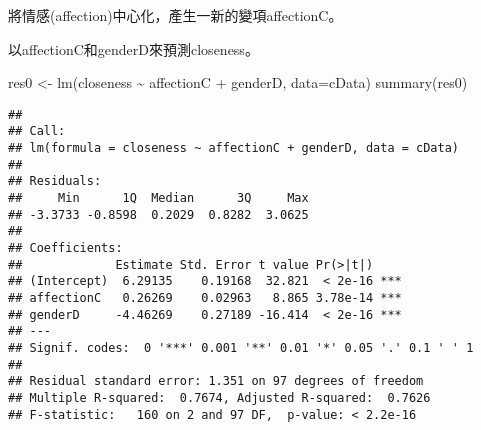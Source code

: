 \documentclass[
]{book}
\newenvironment{Shaded}{\begin{snugshade}}{\end{snugshade}}
\newcommand{\AttributeTok}[1]{\textcolor[rgb]{0.77,0.63,0.00}{#1}}
\newcommand{\ConstantTok}[1]{\textcolor[rgb]{0.00,0.00,0.00}{#1}}
\newcommand{\DecValTok}[1]{\textcolor[rgb]{0.00,0.00,0.81}{#1}}
\newcommand{\FunctionTok}[1]{\textcolor[rgb]{0.00,0.00,0.00}{#1}}
\newcommand{\NormalTok}[1]{#1}
\newcommand{\OtherTok}[1]{\textcolor[rgb]{0.56,0.35,0.01}{#1}}
\newcommand{\SpecialCharTok}[1]{\textcolor[rgb]{0.00,0.00,0.00}{#1}}
\newcommand{\StringTok}[1]{\textcolor[rgb]{0.31,0.60,0.02}{#1}}
\begin{document}
\begin{Shaded}
\end{Shaded}

將情感(affection)中心化，產生一新的變項affectionC。

\begin{Shaded}
\end{Shaded}

以affectionC和genderD來預測closeness。

\begin{Shaded}
\begin{Highlighting}[]
\NormalTok{res0 }\OtherTok{\textless{}{-}} \FunctionTok{lm}\NormalTok{(closeness }\SpecialCharTok{\textasciitilde{}}\NormalTok{ affectionC }\SpecialCharTok{+}\NormalTok{ genderD, }\AttributeTok{data=}\NormalTok{cData)}
\FunctionTok{summary}\NormalTok{(res0)}
\end{Highlighting}
\end{Shaded}

\begin{verbatim}
## 
## Call:
## lm(formula = closeness ~ affectionC + genderD, data = cData)
## 
## Residuals:
##     Min      1Q  Median      3Q     Max 
## -3.3733 -0.8598  0.2029  0.8282  3.0625 
## 
## Coefficients:
##             Estimate Std. Error t value Pr(>|t|)    
## (Intercept)  6.29135    0.19168  32.821  < 2e-16 ***
## affectionC   0.26269    0.02963   8.865 3.78e-14 ***
## genderD     -4.46269    0.27189 -16.414  < 2e-16 ***
## ---
## Signif. codes:  0 '***' 0.001 '**' 0.01 '*' 0.05 '.' 0.1 ' ' 1
## 
## Residual standard error: 1.351 on 97 degrees of freedom
## Multiple R-squared:  0.7674, Adjusted R-squared:  0.7626 
## F-statistic:   160 on 2 and 97 DF,  p-value: < 2.2e-16
\end{verbatim}
\end{document}
